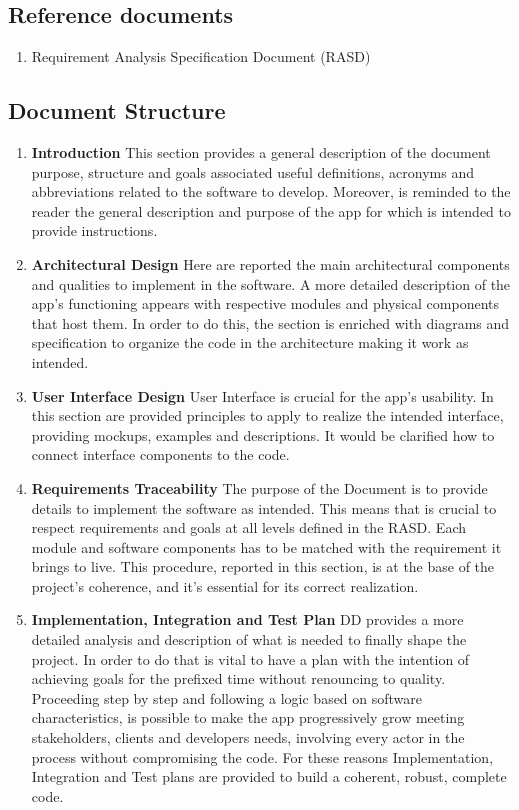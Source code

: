 \subsection{Reference documents}
\begin{enumerate}[label=$\bullet$]
    \item Requirement Analysis Specification Document (RASD)
\end{enumerate}
\subsection{Document Structure}
\begin{enumerate}
    \item \textbf{Introduction} This section provides a general description of the document purpose, structure and goals associated useful definitions, acronyms and abbreviations related to the software to develop. Moreover, is reminded to the reader the general description and purpose of the app for which is intended to provide instructions.
    \item \textbf{Architectural Design} Here are reported the main architectural components and qualities to implement in the software. A more detailed description of the app's functioning appears with respective modules and physical components that host them. In order to do this, the section is enriched with diagrams and specification to organize the code in the architecture making it work as intended.
    \item \textbf{User Interface Design} User Interface is crucial for the app's usability. In this section are provided principles to apply to realize the intended interface, providing mockups, examples and descriptions. It would be clarified how to connect interface components to the code.
    \item \textbf{Requirements Traceability} The purpose of the Document is to provide details to implement the software as intended. This means that is crucial to respect requirements and goals at all levels defined in the RASD. Each module and software components has to be matched with the requirement it brings to live. This procedure, reported in this section, is at the base of the project's coherence, and it's essential for its correct realization.
    \item \textbf{Implementation, Integration and Test Plan} DD provides a more detailed analysis and description of what is needed to finally shape the project. In order to do that is vital to have a plan with the intention of achieving goals for the prefixed time without renouncing to quality. Proceeding step by step and following a logic based on software characteristics, is possible to make the app progressively grow meeting stakeholders, clients and developers needs, involving every actor in the process without compromising the code. For these reasons Implementation, Integration and Test plans are provided to build a coherent, robust, complete code.
\end{enumerate}